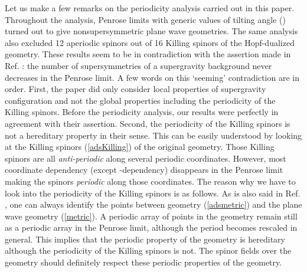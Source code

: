 \documentclass[a4paper,12pt]{article}
\begin{document}
Let us make a few remarks on the periodicity analysis carried out in this paper. Throughout the analysis, Penrose limits with generic values of tilting angle (\coordHE{}) turned out to give nonsupersymmetric plane wave geometries. The same analysis also excluded 12 aperiodic spinors out of 16 Killing spinors of the Hopf-dualized geometry. These results seem to be in contradiction with the assertion made in Ref. \cite{blau3}: the number of supersymmetries of a supergravity background never decreases in the Penrose limit. A few words on this `seeming' contradiction are in order. First, the paper \cite{blau3} did only consider local properties of supergravity configuration and not the global properties including the periodicity of the Killing spinors. Before the periodicity analysis, our results were perfectly in agreement with their assertion. Second, the periodicity of the Killing spinors is not a hereditary property in their sense. This can be easily understood by looking at the Killing spinors (\ref{adsKilling}) of the original \coordHE{} geometry. Those Killing spinors are all {\it anti-periodic} along several periodic coordinates. However, most coordinate dependency (except \coordHE{}-dependency) disappears in the Penrose limit making the spinors {\it periodic} along those coordinates. The reason why we have to look into the periodicity of the Killing spinors is as follows. As is also said in Ref. \cite{blau3}, one can always identify the points between \coordHE{} geometry (\ref{adsmetric}) and the plane wave geometry (\ref{metric}). A periodic array of points in the \coordHE{} geometry remain still as a periodic array in the Penrose limit, although the period becomes rescaled in general. This implies that the periodic property of the geometry is hereditary although the periodicity of the Killing spinors is not. The spinor fields over the geometry should definitely respect these periodic properties of the geometry.
\end{document}
